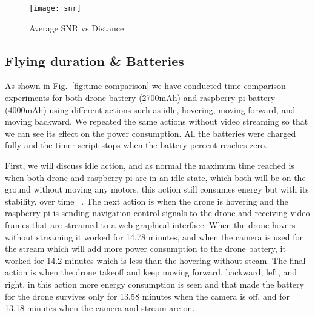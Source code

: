 \documentclass[../main.tex]{subfiles}
\begin{document}
\begin{figure}[!t]
	\centering
	\texttt{[image: snr]}
	\caption{Average SNR vs Distance}
	\label{fig:snr-vs-distance}
\end{figure}

\subsection{Flying duration \& Batteries}

As shown in Fig.~\ref{fig:time-comparison} we have 
conducted time comparison experiments for both drone 
battery (2700mAh) and raspberry pi battery (4000mAh) 
using different actions such as idle, hovering, 
moving forward, and moving backward. We repeated 
the same actions without video streaming so that 
we can see its effect on the power consumption. 
All the batteries were charged fully and the timer 
script stops when the battery percent reaches zero. 

First, we will discuss idle action, and as normal 
the maximum time reached is when both drone and 
raspberry pi are in an idle state, which both will 
be on the ground without moving any motors, 
this action still consumes energy but with 
its stability, over time ~\cite{Abey18}. 
The next action is when the drone is hovering and 
the raspberry pi is sending navigation control 
signals to the drone and receiving video frames 
that are streamed to a web graphical interface. 
When the drone hovers without streaming it worked 
for 14.78 minutes, and when the camera is used for 
the stream which will add more power consumption to 
the drone battery, it worked for 14.2 minutes which 
is less than the hovering without steam. The final 
action is when the drone takeoff and keep moving 
forward, backward, left, and right, in this action 
more energy consumption is seen and that made the 
battery for the drone survives only for 13.58 minutes 
when the camera is off, and for 13.18 minutes 
when the camera and stream are on.
\end{document}

